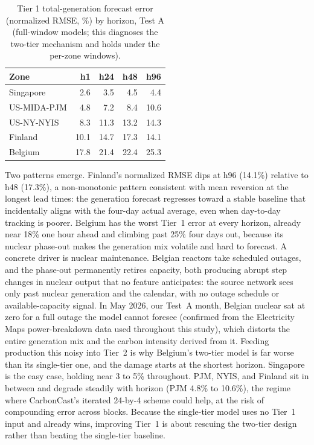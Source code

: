 \documentclass[sigconf,nonacm,a4paper]{acmart}  %
\begin{document}
\begin{table}[H]
    \caption{Tier 1 total-generation forecast error (normalized RMSE, \%) by horizon,
    Test A (full-window models; this diagnoses the two-tier mechanism and holds under
    the per-zone windows).}
    \label{tab:tier1}
    \begin{tabular}{lrrrr}
    \toprule
    Zone & h1 & h24 & h48 & h96 \\
    \midrule
    Singapore   & 2.6  & 3.5  & 4.5  & 4.4 \\
    US-MIDA-PJM & 4.8  & 7.2  & 8.4  & 10.6 \\
    US-NY-NYIS  & 8.3  & 11.3 & 13.2 & 14.3 \\
    Finland     & 10.1 & 14.7 & 17.3 & 14.1 \\
    Belgium     & 17.8 & 21.4 & 22.4 & 25.3 \\
    \bottomrule
    \end{tabular}
\end{table}

Two patterns emerge. Finland's normalized RMSE dips at h96 (14.1\%) relative to
h48 (17.3\%), a non-monotonic pattern consistent with mean reversion at the longest
lead times: the generation forecast regresses toward a stable baseline that
incidentally aligns with the four-day actual average, even when day-to-day tracking
is poorer. Belgium has the worst Tier~1 error at every horizon, already
near 18\% one hour ahead and climbing past 25\% four days out, because its nuclear
phase-out makes the generation mix volatile and hard to forecast. A concrete driver
is nuclear maintenance. Belgian reactors take scheduled outages, and the phase-out
permanently retires capacity, both producing abrupt step changes in nuclear output
that no feature anticipates: the source network sees only past nuclear generation
and the calendar, with no outage schedule or available-capacity signal. In May 2026,
our Test~A month, Belgian nuclear sat at zero for a full outage the model cannot
foresee (confirmed from the Electricity Maps power-breakdown data used throughout
this study), which distorts the entire generation mix and the carbon intensity derived
from it. Feeding production this noisy into Tier~2 is why Belgium's two-tier model
is far worse than its single-tier one, and the damage starts at the shortest
horizon. Singapore is
the easy case, holding near 3 to 5\% throughout. PJM, NYIS, and Finland sit in
between and degrade steadily with horizon (PJM 4.8\% to 10.6\%), the regime where
CarbonCast's iterated 24-by-4 scheme could help, at the risk of compounding error
across blocks. Because the single-tier model uses no Tier~1 input and already wins,
improving Tier~1 is about rescuing the two-tier design rather than beating the
single-tier baseline.
\end{document}
